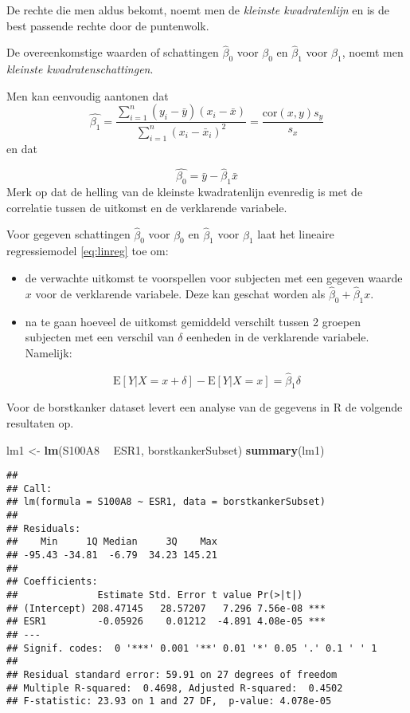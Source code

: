 \documentclass[12pt,dutch,coursenotes]{book}
\newenvironment{Shaded}{\begin{snugshade}}{\end{snugshade}}
\newcommand{\KeywordTok}[1]{\textcolor[rgb]{0.13,0.29,0.53}{\textbf{#1}}}
\newcommand{\StringTok}[1]{\textcolor[rgb]{0.31,0.60,0.02}{#1}}
\newcommand{\OperatorTok}[1]{\textcolor[rgb]{0.81,0.36,0.00}{\textbf{#1}}}
\newcommand{\NormalTok}[1]{#1}
\providecommand{\tightlist}{%
  \setlength{\itemsep}{0pt}\setlength{\parskip}{0pt}}
\theoremstyle{definition}
\theoremstyle{definition}
\theoremstyle{definition}
\theoremstyle{remark}
\begin{document}
De rechte die men aldus bekomt, noemt men de \emph{kleinste
kwadratenlijn} en is de best passende rechte door de puntenwolk.

De overeenkomstige waarden of schattingen \(\hat{\beta}_0\) voor
\(\beta_0\) en \(\hat{\beta}_1\) voor \(\beta_1\), noemt men
\emph{kleinste kwadratenschattingen}.

Men kan eenvoudig aantonen dat
\[\hat{\beta_1}= \frac{\sum\limits_{i=1}^n (y_i-\bar y)(x_i-\bar x)}{\sum\limits_{i=1}^n (x_i-\bar x_i)^2}=\frac{\mbox{cor}(x,y)s_y}{s_x} \]
en dat

\[\hat{\beta_0}=\bar y - \hat{\beta}_1 \bar x \] Merk op dat de helling
van de kleinste kwadratenlijn evenredig is met de correlatie tussen de
uitkomst en de verklarende variabele.

Voor gegeven schattingen \(\hat{\beta}_0\) voor \(\beta_0\) en
\(\hat{\beta}_1\) voor \(\beta_1\) laat het lineaire regressiemodel
\eqref{eq:linreg} toe om:

\begin{itemize}
\tightlist
\item
  de verwachte uitkomst te voorspellen voor subjecten met een gegeven
  waarde \(x\) voor de verklarende variabele. Deze kan geschat worden
  als \(\hat{\beta}_0+\hat{\beta}_1x\).
\item
  na te gaan hoeveel de uitkomst gemiddeld verschilt tussen 2 groepen
  subjecten met een verschil van \(\delta\) eenheden in de verklarende
  variabele. Namelijk:
\end{itemize}

\[\text{E}\left[Y|X=x+\delta\right]-\text{E}\left[Y|X=x\right]= \hat{\beta}_1\delta\]

Voor de borstkanker dataset levert een analyse van de gegevens in R de
volgende resultaten op.

\begin{Shaded}
\begin{Highlighting}[]
\NormalTok{lm1 <-}\StringTok{ }\KeywordTok{lm}\NormalTok{(S100A8 }\OperatorTok{~}\StringTok{ }\NormalTok{ESR1, borstkankerSubset)}
\KeywordTok{summary}\NormalTok{(lm1)}
\end{Highlighting}
\end{Shaded}

\begin{verbatim}
## 
## Call:
## lm(formula = S100A8 ~ ESR1, data = borstkankerSubset)
## 
## Residuals:
##    Min     1Q Median     3Q    Max 
## -95.43 -34.81  -6.79  34.23 145.21 
## 
## Coefficients:
##              Estimate Std. Error t value Pr(>|t|)    
## (Intercept) 208.47145   28.57207   7.296 7.56e-08 ***
## ESR1         -0.05926    0.01212  -4.891 4.08e-05 ***
## ---
## Signif. codes:  0 '***' 0.001 '**' 0.01 '*' 0.05 '.' 0.1 ' ' 1
## 
## Residual standard error: 59.91 on 27 degrees of freedom
## Multiple R-squared:  0.4698, Adjusted R-squared:  0.4502 
## F-statistic: 23.93 on 1 and 27 DF,  p-value: 4.078e-05
\end{verbatim}
\end{document}

